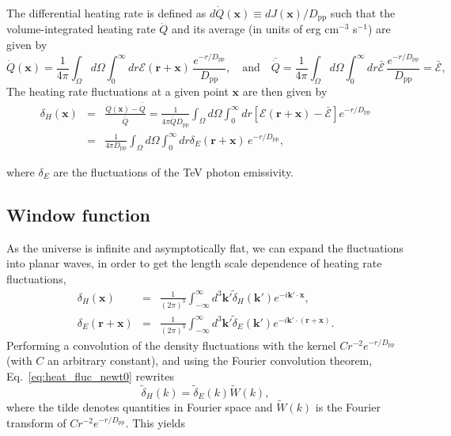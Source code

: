 \documentclass[numberedappendix]{emulateapj}
\begin{document}
 The differential heating rate is defined as $d\dot{Q}(\mathbf{x})\equiv dJ(\mathbf{x})/D_{\mathrm{pp}}$ such that the volume-integrated heating rate $\dot{Q}$ and its average (in units of erg cm$^{-3}$ s$^{-1}$) are given by 
\begin{equation}
  \label{eq:heating_rate0}
  \dot{Q}(\mathbf{x})=
  \frac{1}{4\pi}   \int_{\Omega}d\Omega\int_0^{\infty} dr \mathcal{E}(\mathbf{r}+\mathbf{x})\, \frac{e^{-r/D_{\mathrm{pp}}}}{D_{\mathrm{pp}}},\quad\mbox{and}\quad
  \bar{\dot{Q}}= \frac{1}{4\pi}   \int_{\Omega}d\Omega\int_0^{\infty} dr \bar{\mathcal{E}} \,\frac{e^{-r/D_{\mathrm{pp}}}}{D_{\mathrm{pp}}} = \bar{\mathcal{E}},
\end{equation}
The heating rate fluctuations at a given point $\mathbf{x}$ are then given by 
\begin{eqnarray}
  \label{eq:heat_fluc_newt0}
  \delta_H(\mathbf{x})&=&\frac{\dot{Q}(\mathbf{x})-\bar{\dot{Q}}}{\bar{\dot{Q}}}=
  \frac{1}{4\pi\bar{\dot{Q}}D_{\mathrm{pp}}} \int_{\Omega}d\Omega\int_0^{\infty} dr 
  [\mathcal{E}(\mathbf{r}+\mathbf{x})-\bar{\mathcal{E}}]e^{-r/D_{\mathrm{pp}}} \nonumber\\
  &=&\frac{1}{4\pi D_{\mathrm{pp}}}\int_{\Omega}d\Omega\int_0^{\infty} dr \delta_E(\mathbf{r}+\mathbf{x})\,e^{-r/D_{\mathrm{pp}}} ,
\end{eqnarray}

where $\delta_E$ are the fluctuations of the TeV photon emissivity. 



% 

\subsection{Window function}
As the universe is infinite and asymptotically flat, we can expand the fluctuations into planar waves, in order to get the length scale dependence of heating rate fluctuations,
\begin{eqnarray}
  \label{eq:FT_delta}
  \delta_H(\mathbf{x})&=&\frac{1}{(2\pi)^3}\int_{-\infty}^{\infty} d^3\mathbf{k'} \tilde{\delta}_H(\mathbf{k'}) e^{-i\mathbf{k'}\cdot\mathbf{x}},\\ \nonumber
  \delta_E(\mathbf{r}+\mathbf{x})&=&\frac{1}{(2\pi)^3}\int_{-\infty}^{\infty} d^3\mathbf{k'} \tilde{\delta}_E(\mathbf{k'}) e^{-i\mathbf{k'}\cdot(\mathbf{r}+\mathbf{x})}.
\end{eqnarray}
Performing a convolution of the density fluctuations with the kernel $C r^{-2} e^{-r/D_{\mathrm{pp}}}$ (with $C$ an arbitrary constant), and using the Fourier convolution theorem, Eq.~\eqref{eq:heat_fluc_newt0} rewrites
\begin{equation}
   \label{eq:1}
\tilde{\delta}_H(k) = \tilde{\delta}_E(k) \tilde{W}(k),
 \end{equation}
where the tilde denotes quantities in Fourier space and $\tilde{W}(k)$ is the Fourier transform of $C r^{-2} e^{-r/D_{\mathrm{pp}}}$. This yields
\end{document}
